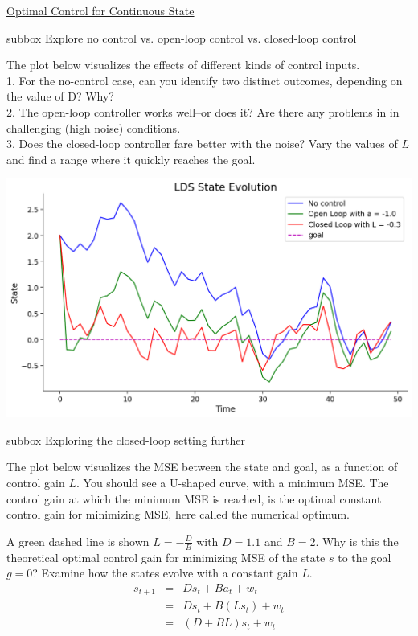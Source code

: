 \begin{textbox}{\href{https://compneuro.neuromatch.io/tutorials/W3D3_OptimalControl/student/W3D3_Tutorial2.html}{Optimal Control for Continuous State}}
\begin{subbox}{subbox}{ Explore no control vs. open-loop control vs. closed-loop control}
\scriptsize

The plot below visualizes the effects of different kinds of control inputs.\\
1.  For the no-control case, can you identify two distinct outcomes, depending on the value of D? Why?\\
2.  The open-loop controller works well--or does it? Are there any problems in in challenging (high noise) conditions.\\
3. Does the closed-loop controller fare better with the noise? Vary the values of $L$ and find a range where it quickly reaches the goal.

\begin{center}
    
\includegraphics[scale=0.2]{Figures/OC/OC_Figure6.png}
\end{center}

\end{subbox}

\begin{subbox}{subbox}{ Exploring the closed-loop setting further }
\scriptsize

The plot below visualizes the MSE between the state and goal, as a function of control gain $L$. You should see a U-shaped curve, with a minimum MSE. The control gain at which the minimum MSE is reached, is the optimal constant control gain for minimizing MSE, here called the numerical optimum. 

A green dashed line is shown $L = -\frac{D}{B}$ with $D=1.1$ and $B=2$. Why is this the theoretical optimal control gain for minimizing MSE of the state $s$ to the goal $g=0$? Examine how the states evolve with a constant gain $L$.
\begin{eqnarray*}
s_{t+1} &=& Ds_t + Ba_t + w_t \\
&=& Ds_t + B(Ls_t) + w_t \\
&=& (D+BL)s_t + w_t \tag{2}
\end{eqnarray*}


\end{subbox}
\end{textbox}
